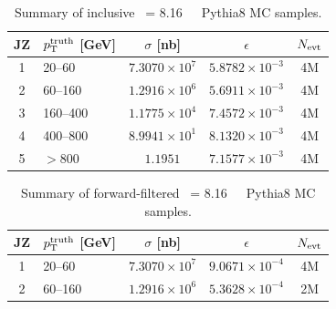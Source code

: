 \begin{table}[!ht]
    \centering
    \begin{tabular}{ | c | l | c | c | c |}
        \hline
        \rule{0pt}{2.25ex}
        JZ   &  \hspace{2mm} $p_{\text{T}}^{\text{truth}}$ [GeV] & $\sigma$ [nb] & $\epsilon$ &  $N_{\text{evt}}$ \\
        \hline\hline
        1    & 20--60      &   $7.3070\times 10^7$  &  $5.8782\times 10^{-3}$ & 4M \\
        \hline
        2    & 60--160     &  $1.2916\times 10^6$   &  $5.6911\times 10^{-3}$ & 4M \\
        \hline
        3    & 160--400    &  $1.1775\times 10^4$   &  $7.4572\times 10^{-3}$ & 4M \\
        \hline
        4    & 400--800    &  $8.9941\times 10^1$   &  $8.1320\times 10^{-3}$ & 4M \\
        \hline
        5    & $>$800      &  $1.1951$   &  $7.1577\times 10^{-3}$ & 4M \\
        \hline
    \end{tabular}
    \vspace{2mm}
    \caption{Summary of inclusive \SNN\ = 8.16~\TeV\ \pxPb\ Pythia8 MC samples.}
    \label{tab:pPbMC}
\end{table}

\begin{table}[!ht]
    \centering
    \begin{tabular}{ | c | l | c | c | c | }
        \hline
        \rule{0pt}{2.25ex}
        JZ   &  \hspace{2mm} $p_{\text{T}}^{\text{truth}}$ [GeV] & $\sigma$ [nb] & $\epsilon$ & $N_{\text{evt}}$ \\
        \hline\hline
        1    & 20--60      &  $7.3070\times 10^7$   &  $9.0671\times 10^{-4}$ & 4M \\
        \hline
        2    & 60--160     &  $1.2916\times 10^6$   &  $5.3628\times 10^{-4}$ & 2M \\
        \hline
    \end{tabular}
    \vspace{2mm}
    \caption{Summary of forward-filtered \SNN\ = 8.16~\TeV\ \pxPb\ Pythia8 MC samples.}
    \label{tab:pPbMCFF}
\end{table}

